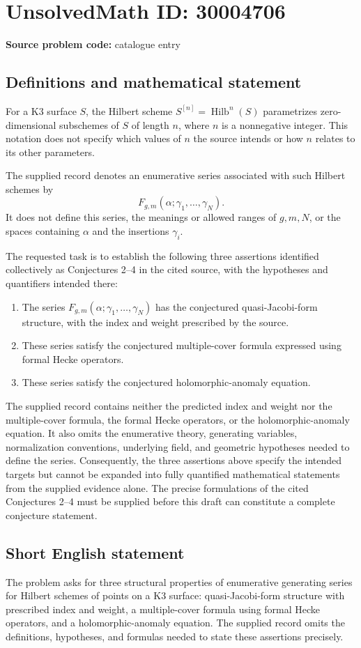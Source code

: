 \documentclass[11pt]{article}
\begin{document}
\section*{UnsolvedMath ID: 30004706}
\textbf{Source problem code:} catalogue entry
\subsection{Definitions and mathematical statement}
For a K3 surface \(S\), the Hilbert scheme \(S^{[n]}=\operatorname{Hilb}^{n}(S)\) parametrizes zero-dimensional subschemes of \(S\) of length \(n\), where \(n\) is a nonnegative integer. This notation does not specify which values of \(n\) the source intends or how \(n\) relates to its other parameters.

The supplied record denotes an enumerative series associated with such Hilbert schemes by
\[
F_{g,m}(\alpha;\gamma_1,\ldots,\gamma_N).
\]
It does not define this series, the meanings or allowed ranges of \(g,m,N\), or the spaces containing \(\alpha\) and the insertions \(\gamma_i\).

The requested task is to establish the following three assertions identified collectively as Conjectures 2--4 in the cited source, with the hypotheses and quantifiers intended there:
\begin{enumerate}
\item The series \(F_{g,m}(\alpha;\gamma_1,\ldots,\gamma_N)\) has the conjectured quasi-Jacobi-form structure, with the index and weight prescribed by the source.
\item These series satisfy the conjectured multiple-cover formula expressed using formal Hecke operators.
\item These series satisfy the conjectured holomorphic-anomaly equation.
\end{enumerate}
The supplied record contains neither the predicted index and weight nor the multiple-cover formula, the formal Hecke operators, or the holomorphic-anomaly equation. It also omits the enumerative theory, generating variables, normalization conventions, underlying field, and geometric hypotheses needed to define the series. Consequently, the three assertions above specify the intended targets but cannot be expanded into fully quantified mathematical statements from the supplied evidence alone. The precise formulations of the cited Conjectures 2--4 must be supplied before this draft can constitute a complete conjecture statement.
\subsection{Short English statement}
The problem asks for three structural properties of enumerative generating series for Hilbert schemes of points on a K3 surface: quasi-Jacobi-form structure with prescribed index and weight, a multiple-cover formula using formal Hecke operators, and a holomorphic-anomaly equation. The supplied record omits the definitions, hypotheses, and formulas needed to state these assertions precisely.
\end{document}
